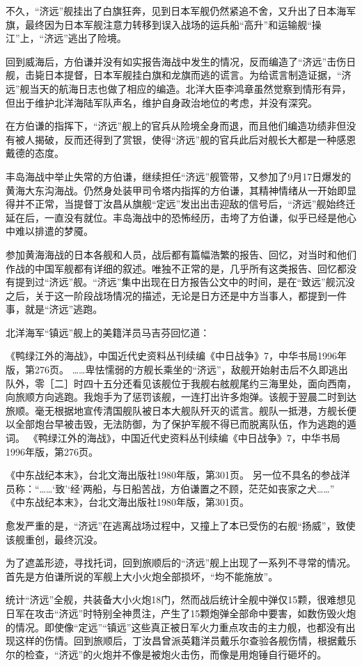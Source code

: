 \documentclass[12pt,UTF8]{ctexbook}
\begin{document}
不久，“济远”舰挂出了白旗狂奔，见到日本军舰仍然紧追不舍，又升出了日本海军旗，最终因为日本军舰注意力转移到误入战场的运兵船“高升”和运输舰“操江”上，“济远”逃出了险境。

回到威海后，方伯谦并没有如实报告海战中发生的情况，反而编造了“济远”击伤日舰，击毙日本提督，日本军舰挂白旗和龙旗而逃的谎言。为给谎言制造证据，“济远”舰当天的航海日志也做了相应的编造。北洋大臣李鸿章虽然觉察到情形有异，但出于维护北洋海陆军队声名，维护自身政治地位的考虑，并没有深究。

在方伯谦的指挥下，“济远”舰上的官兵从险境全身而退，而且他们编造功绩非但没有被人揭破，反而还得到了赏银，使得“济远”舰的官兵此后对舰长大都是一种感恩戴德的态度。

丰岛海战中举止失常的方伯谦，继续担任“济远”舰管带，又参加了9月17日爆发的黄海大东沟海战。仍然身处装甲司令塔内指挥的方伯谦，其精神情绪从一开始即显得并不正常，当提督丁汝昌从旗舰“定远”发出出击迎敌的信号后，“济远”舰始终迁延在后，一直没有就位。丰岛海战中的恐怖经历，击垮了方伯谦，似乎已经是他心中难以排遣的梦魇。

参加黄海海战的日本各舰和人员，战后都有篇幅浩繁的报告、回忆，对当时和他们作战的中国军舰都有详细的叙述。唯独不正常的是，几乎所有这类报告、回忆都没有提到过“济远”舰。“济远”集中出现在日方报告公文中的时间，是在“致远”舰沉没之后，关于这一阶段战场情况的描述，无论是日方还是中方当事人，都提到一件事，就是“济远”逃跑。

北洋海军“镇远”舰上的美籍洋员马吉芬回忆道：

《鸭绿江外的海战》，中国近代史资料丛刊续编《中日战争》7，中华书局1996年版，第276页。
……卑怯懦弱的方舰长乘坐的“济远”，敌舰开始射击后不久即逃出队外，零［二］时四十五分还看见该舰位于我舰右舷舰尾约三海里处，面向西南，向旅顺方向逃跑。我炮手为了惩罚该舰，一连打出许多炮弹。该舰于翌晨二时到达旅顺。毫无根据地宣传清国舰队被日本大舰队歼灭的谎言。舰队一抵港，方舰长便以全部炮台早被击毁，无法防御，为了保护军舰不得已而脱离队伍，作为逃跑的遁词。 《鸭绿江外的海战》，中国近代史资料丛刊续编《中日战争》7，中华书局1996年版，第276页。

《中东战纪本末》，台北文海出版社1980年版，第301页。
另一位不具名的参战洋员称：“……‘致’‘经’两船，与日船苦战，方伯谦置之不顾，茫茫如丧家之犬……” 《中东战纪本末》，台北文海出版社1980年版，第301页。

愈发严重的是，“济远”在逃离战场过程中，又撞上了本已受伤的右舰“扬威”，致使该舰重创，最终沉没。

为了遮盖形迹，寻找托词，回到旅顺后的“济远”舰上出现了一系列不寻常的情况。首先是方伯谦所说的军舰上大小火炮全部损坏，“均不能施放”。

统计“济远”全舰，共装备大小火炮18门，然而战后统计全舰中弹仅15颗，很难想见日军在攻击“济远”时特别全神贯注，产生了15颗炮弹全部命中要害，如数伤毁火炮的情况。即使像“定远”“镇远”这些真正被日军火力重点攻击的主力舰，也都没有出现这样的伤情。回到旅顺后，丁汝昌曾派英籍洋员戴乐尔查验各舰伤情，根据戴乐尔的检查，“济远”的火炮并不像是被炮火击伤，而像是用炮锤自行砸坏的。
\end{document}
